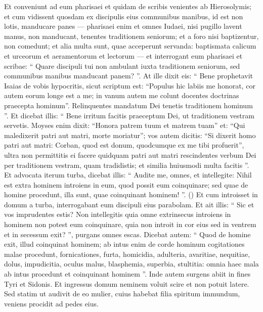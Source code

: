 \begin{biblechapter}
\begin{biblechapter}
\begin{biblechapter}
\begin{biblechapter}
\begin{biblechapter}
\begin{biblechapter}
\begin{biblechapter}
\verse Et conveniunt ad eum pharisaei et quidam de scribis venientes ab Hierosolymis; 
\verse et cum vidissent quosdam ex discipulis eius communibus manibus, id est non lotis, manducare panes 
\verse — pharisaei enim et omnes Iudaei, nisi pugillo lavent manus, non manducant, tenentes traditionem seniorum; 
 \verse et a foro nisi baptizentur, non comedunt; et alia multa sunt, quae acceperunt servanda: baptismata calicum et urceorum et aeramentorum et lectorum — 
\verse et interrogant eum pharisaei et scribae: “ Quare discipuli tui non ambulant iuxta traditionem seniorum, sed communibus manibus manducant panem? ”. 
\verse At ille dixit eis: “ Bene prophetavit Isaias de vobis hypocritis, sicut scriptum est:
 “Populus hic labiis me honorat,
 cor autem eorum longe est a me;
 \verse in vanum autem me colunt
 docentes doctrinas praecepta hominum”.
 \verse Relinquentes mandatum Dei tenetis traditionem hominum ”. 
\verse Et dicebat illis: “ Bene irritum facitis praeceptum Dei, ut traditionem vestram servetis. 
 \verse Moyses enim dixit: “Honora patrem tuum et matrem tuam” et: “Qui maledixerit patri aut matri, morte moriatur”; 
\verse vos autem dicitis: “Si dixerit homo patri aut matri: Corban, quod est donum, quodcumque ex me tibi profuerit”, 
 \verse ultra non permittitis ei facere quidquam patri aut matri 
\verse rescindentes verbum Dei per traditionem vestram, quam tradidistis; et similia huiusmodi multa facitis ”.
 \verse Et advocata iterum turba, dicebat illis: “ Audite me, omnes, et intellegite: 
 \verse Nihil est extra hominem introiens in eum, quod possit
 eum coinquinare; sed quae de homine procedunt, illa sunt, quae coinquinant hominem! ”. 
(\verse) \verse Et cum introisset in domum a turba, interrogabant eum discipuli eius parabolam. 
\verse Et ait illis: “ Sic et vos imprudentes estis? Non intellegitis quia omne extrinsecus introiens in hominem non potest eum coinquinare, 
\verse quia non introit in cor eius sed in ventrem et in secessum exit? ”, purgans omnes escas. 
\verse Dicebat autem: “ Quod de homine exit, illud coinquinat hominem; 
\verse ab intus enim de corde hominum cogitationes malae procedunt, fornicationes, furta, homicidia, 
\verse adulteria, avaritiae, nequitiae, dolus, impudicitia, oculus malus, blasphemia, superbia, stultitia: 
 \verse omnia haec mala ab intus procedunt et coinquinant hominem ”.
 \verse Inde autem surgens abiit in fines Tyri et Sidonis. Et ingressus domum neminem voluit scire et non potuit latere. 
\verse Sed statim ut audivit de eo mulier, cuius habebat filia spiritum immundum, veniens procidit ad pedes eius. 

\end{biblechapter}
\end{biblechapter}
\end{biblechapter}
\end{biblechapter}
\end{biblechapter}
\end{biblechapter}
\end{biblechapter}
